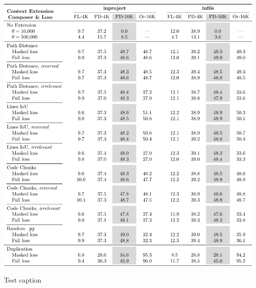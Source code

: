 \begin{table}[htbp]
    \centering
    \includegraphics[width=\textwidth]{tables/rq_b_gradient_masking.pdf}
    \caption{Test caption}\label{tab:ocoder-gradient-masking}
\end{table}
